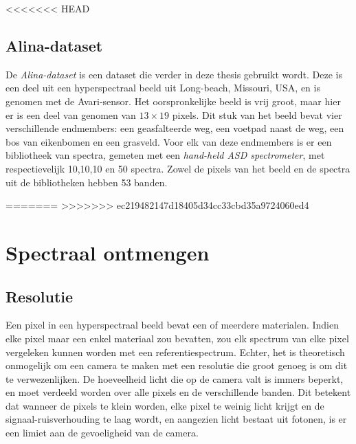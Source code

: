 \documentclass[12pt]{report}
\begin{document}
<<<<<<< HEAD
\section{Alina-dataset}\cite{Alina}

De \textit{Alina-dataset} is een dataset die verder in deze thesis gebruikt wordt. Deze is een deel uit een hyperspectraal beeld uit Long-beach, Missouri, USA, en is genomen met de Avari-sensor. Het oorspronkelijke beeld is vrij groot, maar hier er is een deel van genomen van $13\times 19$ pixels. Dit stuk van het beeld bevat vier verschillende endmembers: een geasfalteerde weg, een voetpad naast de weg, een bos van eikenbomen en een grasveld. Voor elk van deze endmembers is er een bibliotheek van spectra, gemeten met een \textit{hand-held ASD spectrometer}, met respectievelijk 10,10,10 en 50 spectra. Zowel de pixels van het beeld en de spectra uit de bibliotheken hebben 53 banden. 

=======
>>>>>>> ec219482147d18405d34cc33cbd35a9724060ed4


\chapter{Spectraal ontmengen}




\section{Resolutie}

Een pixel in een hyperspectraal beeld bevat een of meerdere materialen. Indien elke pixel maar een enkel materiaal zou bevatten, zou elk spectrum van elke pixel vergeleken kunnen worden met een referentiespectrum. Echter, het is theoretisch onmogelijk om een camera te maken met een resolutie die groot genoeg is om dit te verwezenlijken. De hoeveelheid licht die op de camera valt is immers beperkt, en moet verdeeld worden over alle pixels en de verschillende banden. Dit betekent dat wanneer de pixels te klein worden, elke pixel te weinig licht krijgt en de signaal-ruisverhouding te laag wordt, en aangezien licht bestaat uit fotonen, is er een limiet aan de gevoeligheid van de camera. 
\end{document}
